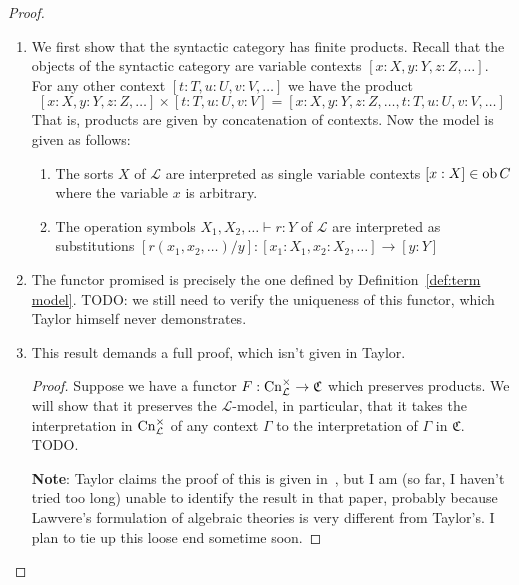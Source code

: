 \documentclass[12pt,twoside]{reedthesis}
\theoremstyle{definition}
\theoremstyle{remark}
\theoremstyle{plain}
\begin{document}
\begin{proof}\,\\
  \begin{enumerate}
    \item We first show that the syntactic category has finite products. Recall
    that the objects of the syntactic category are variable contexts \([x : X, y
    : Y, z : Z, \dots]\). For any other context \( [t : T, u : U, v : V, \dots]
    \) we have the product \[ [x : X, y : Y, z : Z, \dots] \times [t : T, u : U,
    v : V] = [x : X, y : Y, z : Z, \dots, t : T, u : U, v : V, \dots]\] That
    is, products are given by concatenation of contexts. Now the model is given
    as follows:
    \begin{enumerate}
      \item The sorts $X$ of $\mathcal{L}$ are interpreted as single variable
      contexts $[x:X] \in \mathrm{ob}\, C$ where the variable $x$ is arbitrary.
      \item The operation symbols \( X_1, X_2, \dots \vdash r : Y \) of
      $\mathcal{L}$ are interpreted as substitutions \( [r(x_1, x_2, \dots)/y] :
      [x_1:X_1, x_2:X_2,\dots] \rightarrow [y : Y]\) 
    \end{enumerate}
    \item The functor promised is precisely the one defined by
          Definition~\ref{def:term model}. TODO: we still need to verify the
          uniqueness of this functor, which Taylor himself never demonstrates.
          \item This result demands a full proof, which isn't given in Taylor.
          \begin{proof}
            Suppose we have a functor $F : \mathrm{Cn}_{\mathcal{L}}^{\times} \rightarrow \mathfrak{C}$
            which preserves products. We will show that it preserves the
            $\mathcal{L}$-model, in particular, that it takes the interpretation
            in $\mathrm{Cn}_{\mathcal{L}}^{\times}$ of any context $\Gamma$ to the interpretation
            of $\Gamma$ in $\mathfrak{C}$. TODO.

            \textbf{Note}: Taylor claims the proof of this is given
            in~\cite{lawvere_functorial_1963}, but I am (so far, I haven't tried
            too long) unable to identify the result in that paper, probably
            because Lawvere's formulation of algebraic theories is very
            different from Taylor's. I plan to tie up this loose end sometime
            soon.
          \end{proof}
  \end{enumerate}
\end{proof}
\end{document}
